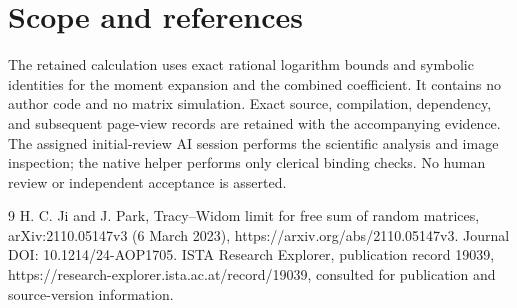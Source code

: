 \documentclass[10pt]{article}
\begin{document}
\section*{Scope and references}
The retained calculation uses exact rational logarithm bounds and symbolic identities for the moment expansion and the combined coefficient. It contains no author code and no matrix simulation. Exact source, compilation, dependency, and subsequent page-view records are retained with the accompanying evidence. The assigned initial-review AI session performs the scientific analysis and image inspection; the native helper performs only clerical binding checks. No human review or independent acceptance is asserted.\par
9 H. C. Ji and J. Park, Tracy–Widom limit for free sum of random matrices, arXiv:2110.05147v3 (6 March 2023), https://arxiv.org/abs/2110.05147v3. Journal DOI: 10.1214/24-AOP1705. ISTA Research Explorer, publication record 19039, https://research-explorer.ista.ac.at/record/19039, consulted for publication and source-version information.\par
\end{document}
